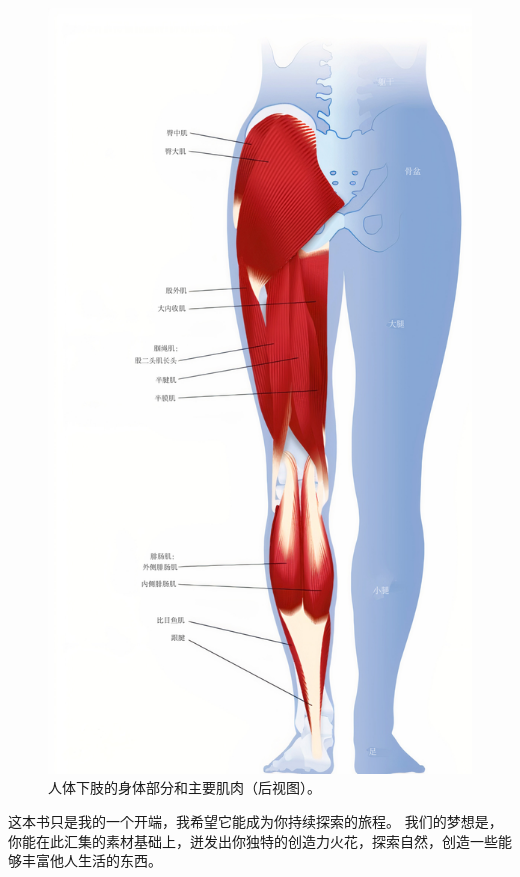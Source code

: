 \begin{figure}[!htb]
	\centering
	\includegraphics[width=0.75\linewidth]{chap1/1_19}
	\caption{人体下肢的身体部分和主要肌肉（后视图）。 \label{fig:1_19}}
\end{figure}


这本书只是我的一个开端，我希望它能成为你持续探索的旅程。
我们的梦想是，你能在此汇集的素材基础上，迸发出你独特的创造力火花，探索自然，创造一些能够丰富他人生活的东西。
















